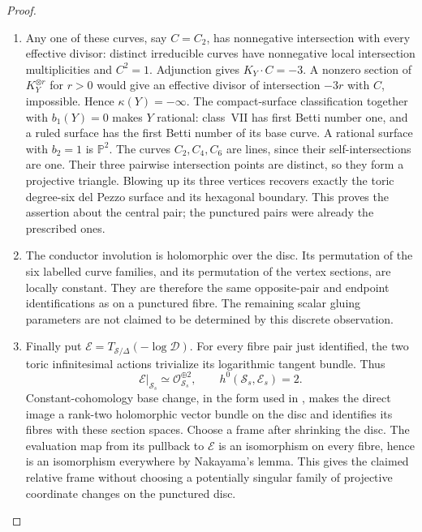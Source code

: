 \begin{proof}
\begin{enumerate}[label={$\langle1\rangle$\arabic*.},leftmargin=*]
\item Any one of these curves, say $C=C_2$,
has nonnegative intersection with every
effective divisor: distinct irreducible
curves have nonnegative local intersection
multiplicities and $C^2=1$.  Adjunction
gives $K_Y\cdot C=-3$.  A nonzero section
of $K_Y^{\otimes r}$ for $r>0$ would
give an effective divisor of intersection
$-3r$ with $C$, impossible.  Hence
$\kappa(Y)=-\infty$.  The compact-surface
classification
\cite[Chapter~VI, Theorem~1.1 and Table~10]{BHPV2004E}
together with $b_1(Y)=0$ makes $Y$ rational:
class~VII has first Betti number one,
and a ruled surface has the first Betti
number of its base curve.  A rational
surface with $b_2=1$ is $\mathbb P^2$.
The curves $C_2,C_4,C_6$ are lines,
since their self-intersections are one.
Their three pairwise intersection points
are distinct, so they form a projective
triangle.  Blowing up its three vertices
recovers exactly the toric degree-six
del Pezzo surface and its hexagonal
boundary.  This proves the assertion
about the central pair; the punctured
pairs were already the prescribed ones.

\item The conductor involution is holomorphic
over the disc.  Its permutation of the
six labelled curve families, and its
permutation of the vertex sections,
are locally constant.  They are therefore
the same opposite-pair and endpoint
identifications as on a punctured fibre.
The remaining scalar gluing parameters
are not claimed to be determined by
this discrete observation.

\item Finally put
$\mathcal E=T_{\mathcal S/\Delta}(-\log\mathcal D)$.
For every fibre pair just identified,
the two toric infinitesimal actions
trivialize its logarithmic tangent
bundle.  Thus
\[
 \mathcal E|_{\mathcal S_s}\simeq
 \mathcal O_{\mathcal S_s}^{\oplus2},
 \qquad h^0(\mathcal S_s,\mathcal E_s)=2.
\]
Constant-cohomology base change, in the
form used in , makes the direct
image a rank-two holomorphic vector
bundle on the disc and identifies its
fibres with these section spaces.
Choose a frame after shrinking the
disc.  The evaluation map from its
pullback to $\mathcal E$ is an
isomorphism on every fibre, hence
is an isomorphism everywhere by
Nakayama's lemma.  This gives the
claimed relative frame without
choosing a potentially singular
family of projective coordinate
changes on the punctured disc.

\end{enumerate}
\end{proof}
